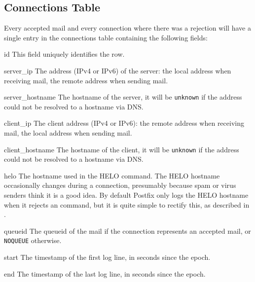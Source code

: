 \subsection{Connections Table}

\label{connections table}

Every accepted mail and every connection where there was a rejection will
have a single entry in the connections table containing the following
fields:

\begin{eqlist}

    \item [id] This field uniquely identifies the row.

    \item [server\_ip] The  address (IPv4 or IPv6) of the
        server: the local address when receiving mail, the remote address
        when sending mail.

    \item [server\_hostname] The hostname of the server, it will be
        \texttt{unknown} if the  address could not be resolved
        to a hostname via DNS\@.

    \item [client\_ip] The client  address (IPv4 or IPv6): the
        remote address when receiving mail, the local address when sending
        mail.

    \item [client\_hostname] The hostname of the client, it will be
        \texttt{unknown} if the  address could not be resolved
        to a hostname via DNS\@.

    \item [helo] The hostname used in the HELO command.  The HELO hostname
        occasionally changes during a connection, presumably because spam
        or virus senders think it is a good idea.  By default Postfix only
        logs the HELO hostname when it rejects an  command,
        but it is quite simple to rectify this, as described in
        .

    \item [queueid] The queueid of the mail if the connection represents an
        accepted mail, or \texttt{NOQUEUE} otherwise.

    \item [start] The timestamp of the first log line, in seconds since the
        epoch.

    \item [end] The timestamp of the last log line, in seconds since the
        epoch.

\end{eqlist}

